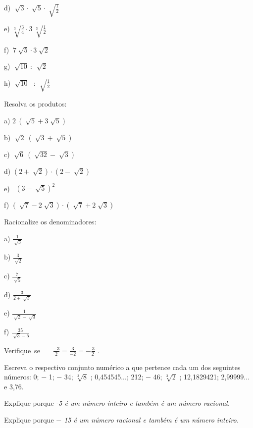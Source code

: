 \begin{exercicios}
\begin{multicols}{4}
		d)  \( \sqrt[]{3}  \cdot  \sqrt[]{5} \cdot \sqrt[]{\frac{1}{2}} \)
		
		e)  \( \sqrt[3]{\frac{3}{4}} \cdot 3~ \sqrt[3]{\frac{1}{2}} \)
		
		f)  \( ~7 \sqrt[]{5}  \cdot  3 \sqrt[]{2} \)
		
		g)  \( \sqrt[]{10}~:~\sqrt[]{2} \)
		
		h)  \( \sqrt[]{10}\text{~ : }\sqrt[]{\frac{1}{2}} \) 
\end{multicols}
	\exitem{} Resolva os produtos:

\begin{multicols}{2}
	a) \( 2~ \left( \sqrt[]{5}+3\sqrt[]{5} \right)  \)
	
	b)  \( \sqrt[]{2}~ \left( \sqrt[]{3}+\sqrt[]{5} \right)  \)
	
	c)  \( \sqrt[]{6}~ \left( \sqrt[]{32}-\sqrt[]{3} \right)  \)
	
	d)  \(  \left( 2+\sqrt[]{2} \right)  \cdot  \left( 2-\sqrt[]{2} \right)  \)
	
	e)~  \(  \left( 3-\sqrt[]{5} \right) ^{2} \)
	
	f)  \(  \left( \sqrt[]{7}-2\sqrt[]{3} \right)  \cdot  \left( \sqrt[]{7}+2\sqrt[]{3} \right)  \)
\end{multicols}

	\exitem{} Racionalize os denominadores:

\begin{multicols}{5}

	a) \( \frac{1}{\sqrt[]{3}} \)
	
	b)  \( \frac{3}{\sqrt[]{2}} \)
	
	c)  \( \frac{7}{\sqrt[]{5}} \)
	
	d)  \( \frac{3}{2+\sqrt[]{3}} \)
	
	e)  \( \frac{1}{\sqrt[]{2}-\sqrt[]{3}} \)
	
	f)  \( \frac{35}{\sqrt[]{3}-5} \)
\end{multicols}

\exitem{} Verifique~se~~~   \( \frac{-3}{2}=\frac{3}{-2}=-\frac{3}{2~} \) .

\exitem{} Escreva o respectivo conjunto numérico a que pertence cada um dos seguintes números:  0; $-$ 1; $-$ 34;  \( \sqrt[3]{8} \) ; 0,454545...; 212; $-$ 46;  \( \sqrt[3]{2} \) ; 12,1829421; 2,99999... e 3,76.

\exitem{} Explique porque \textit{-5 é um número inteiro e também é um número racional.}

\exitem{} Explique porque \textit{$-$ 15 é um número racional e também é um número inteiro.}


\end{exercicios}
